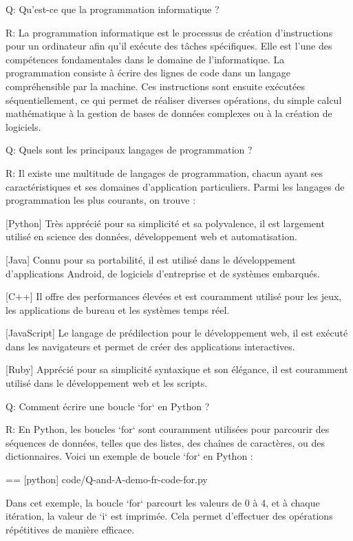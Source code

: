 
Q:
  Qu'est-ce que la programmation informatique ?

R:
  La programmation informatique est le processus de création d'instructions pour un ordinateur afin qu'il exécute des tâches spécifiques. Elle est l'une des compétences fondamentales dans le domaine de l'informatique. La programmation consiste à écrire des lignes de code dans un langage compréhensible par la machine. Ces instructions sont ensuite exécutées séquentiellement, ce qui permet de réaliser diverses opérations, du simple calcul mathématique à la gestion de bases de données complexes ou à la création de logiciels.

Q:
  Quels sont les principaux langages de programmation ?

R:
  Il existe une multitude de langages de programmation, chacun ayant ses caractéristiques et ses domaines d'application particuliers. Parmi les langages de programmation les plus courants, on trouve :

  [Python]
    Très apprécié pour sa simplicité et sa polyvalence, il est largement utilisé en science des données, développement web et automatisation.

  [Java]
    Connu pour sa portabilité, il est utilisé dans le développement d'applications Android, de logiciels d'entreprise et de systèmes embarqués.

  [C++]
    Il offre des performances élevées et est couramment utilisé pour les jeux, les applications de bureau et les systèmes temps réel.

  [JavaScript]
    Le langage de prédilection pour le développement web, il est exécuté dans les navigateurs et permet de créer des applications interactives.

  [Ruby]
    Apprécié pour sa simplicité syntaxique et son élégance, il est couramment utilisé dans le développement web et les scripts.

Q:
  Comment écrire une boucle `for` en Python ?

R:
  En Python, les boucles `for` sont couramment utilisées pour parcourir des séquences de données, telles que des listes, des chaînes de caractères, ou des dictionnaires. Voici un exemple de boucle `for` en Python :

  == [python] {code/Q-and-A-demo-fr-code-for.py}

  Dans cet exemple, la boucle `for` parcourt les valeurs de 0 à 4, et à chaque itération, la valeur de `i` est imprimée. Cela permet d'effectuer des opérations répétitives de manière efficace.

